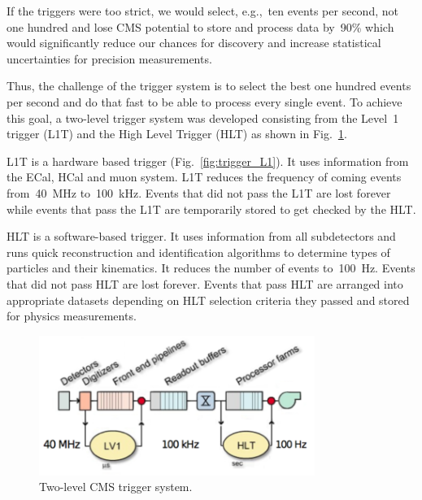 If the triggers were too strict, we would select, e.g.,~ten events per second, not one hundred and lose CMS potential to store and process data by~90\% which would significantly reduce our chances for discovery and increase statistical uncertainties for precision measurements.

Thus, the challenge of the trigger system is to select the best one hundred events per second and do that fast to be able to process every single event. To achieve this goal, a two-level trigger system was developed consisting from the Level~1 trigger (L1T) and the High Level Trigger (HLT) as shown in Fig.~\ref{fig:trigger_2level}.

L1T is a hardware based trigger (Fig.~\ref{fig:trigger_L1}). It uses information from the ECal, HCal and muon system. L1T reduces the frequency of coming events from~40~MHz to~100~kHz. Events that did not pass the L1T are lost forever while events that pass the L1T are temporarily stored to get checked by the HLT.

HLT is a software-based trigger. It uses information from all subdetectors and runs quick reconstruction and identification algorithms to determine types of particles and their kinematics. It reduces the number of events to~100~Hz. Events that did not pass HLT are lost forever. Events that pass HLT are arranged into appropriate datasets depending on HLT selection criteria they passed and stored for physics measurements.

\begin{figure}[htb]
  \begin{center}
    \includegraphics[width=0.8\textwidth]{../figs/Exp/trigger_2level.png}
    \caption{Two-level CMS trigger system.}
    \label{fig:trigger_2level}
  \end{center}
\end{figure}

